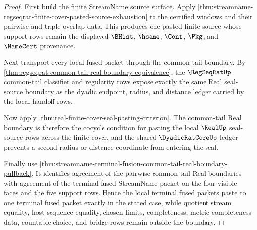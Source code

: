 \begin{proof}
First build the finite StreamName source surface. Apply \autoref{thm:streamname-regseqrat-finite-cover-pasted-source-exhaustion} to the certified windows and their pairwise and triple overlap data. This produces one pasted finite source whose support rows remain the displayed $\BHist$, $\hsame$, $\Cont$, $\Pkg$, and $\NameCert$ provenance.

Next transport every local fused packet through the common-tail boundary. By \autoref{thm:regseqrat-common-tail-real-boundary-equivalence}, the $\RegSeqRatUp$ common-tail classifier and regularity rows expose exactly the same Real seal-source boundary as the dyadic endpoint, radius, and distance ledger carried by the local handoff rows.

Now apply \autoref{thm:real-finite-cover-seal-pasting-criterion}. The common-tail Real boundary is therefore the cocycle condition for pasting the local $\RealUp$ seal-source rows across the finite cover, and the shared $\DyadicRatCoreUp$ ledger prevents a second radius or distance coordinate from entering the seal.

Finally use \autoref{thm:streamname-terminal-fusion-common-tail-real-boundary-pullback}. It identifies agreement of the pairwise common-tail Real boundaries with agreement of the terminal fused StreamName packet on the four visible faces and the five support rows. Hence the local terminal fused packets paste to one terminal fused packet exactly in the stated case, while quotient stream equality, host sequence equality, chosen limits, completeness, metric-completeness data, countable choice, and bridge rows remain outside the boundary.
\end{proof}

